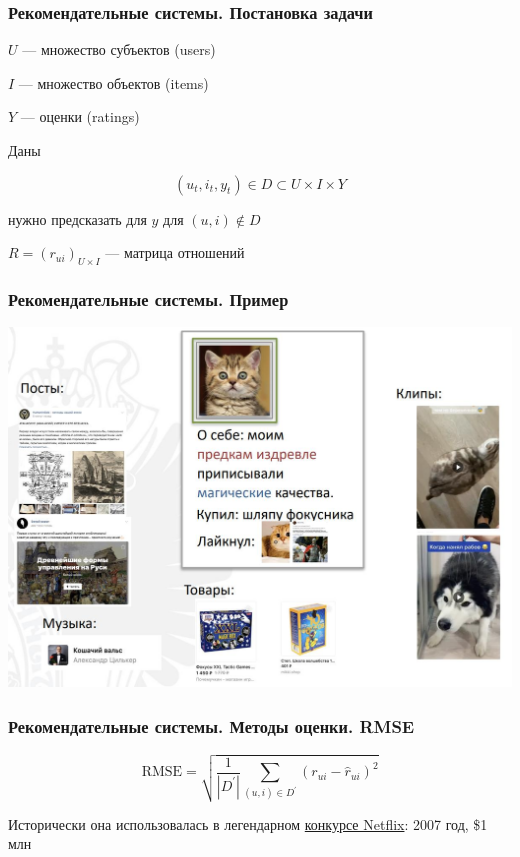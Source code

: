 \documentclass[fullscreen=true, bookmarks=true, hyperref={pdfencoding=unicode}]{beamer}
\begin{document}
\begin{frame}
  \frametitle{Рекомендательные системы. Постановка задачи}

  $U$ — множество субъектов (users)

  $I$ — множество объектов (items)

  $Y$ — оценки (ratings)

  \vspace{1cm}
  Даны

  $$ (u_t, i_t, y_t) \in D \subset U \times I \times Y $$

  нужно предсказать для $y$ для $(u, i) \notin D$

  \vspace{1cm}
  $ R = (r_{ui})_{U\times I}$ — матрица отношений
\end{frame}


\begin{frame}
  \frametitle{Рекомендательные системы. Пример}

  \begin{center}
    \includegraphics[keepaspectratio,
                   width=.8\paperwidth]{rec_sys.jpg}
  \end{center}
\end{frame}


\begin{frame}
  \frametitle{Рекомендательные системы. Методы оценки. RMSE}

  $$ \text{RMSE} = \sqrt{\frac{1}{|D^\prime|} \sum\limits_{(u,i) \in D^\prime} (r_{ui}-\hat r_{ui})^2} $$

  \vspace{1cm}
  Исторически она использовалась в легендарном \href{https://ru.wikipedia.org/wiki/Netflix_Prize}{конкурсе Netflix}: 2007 год, \$1 млн

\end{frame}
\end{document}
